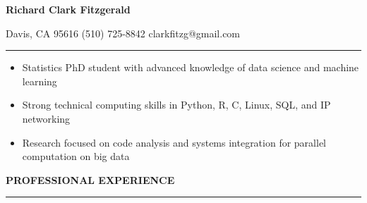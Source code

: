 \documentclass{article}
\begin{document}
\begin{center}
{\Large\bf Richard Clark Fitzgerald} 
\end{center}

\hspace{4cm} Davis, CA 95616 \hspace{0.5cm} (510) 725-8842 \hspace{0.5cm} clarkfitzg@gmail.com 

\vspace{0.2cm}
\hrule
\vspace{0.2cm}

\begin{itemize}
  \setlength{\itemsep}{-1pt}

\item Statistics PhD student with advanced knowledge of data science
    and machine learning
    
\item Strong technical computing skills in Python, R, C, Linux, SQL, and IP networking

\item Research focused on code analysis and systems integration for parallel
    computation on big data

\end{itemize}

\vspace{0.1 cm}

\textbf{PROFESSIONAL EXPERIENCE}
\vspace{0.2 cm}
\hrule
\vspace{0.1cm}
\end{document}
